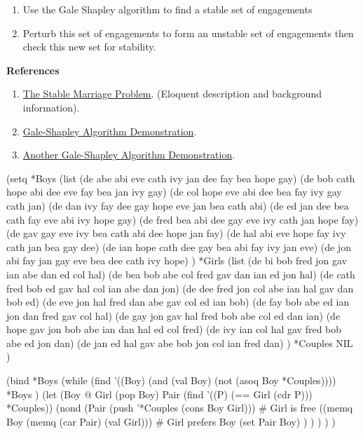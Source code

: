 \begin{itemize}
\begin{enumerate}
\item
  Use the Gale Shapley algorithm to find a stable set of engagements
\item
  Perturb this set of engagements to form an unstable set of engagements
  then check this new set for stability.
\end{enumerate}

\textbf{References}

\begin{enumerate}
\item
  \href{http://www.cs.columbia.edu/~evs/intro/stable/writeup.html}{The
  Stable Marriage Problem}. (Eloquent description and background
  information).
\item
  \href{http://sephlietz.com/gale-shapley/}{Gale-Shapley Algorithm
  Demonstration}.
\item
  \href{http://mathsite.math.berkeley.edu/smp/smp.html}{Another
  Gale-Shapley Algorithm Demonstration}.
\end{enumerate}

\begin{wideverbatim}

(setq
   *Boys (list
      (de abe  abi eve cath ivy jan dee fay bea hope gay)
      (de bob  cath hope abi dee eve fay bea jan ivy gay)
      (de col  hope eve abi dee bea fay ivy gay cath jan)
      (de dan  ivy fay dee gay hope eve jan bea cath abi)
      (de ed   jan dee bea cath fay eve abi ivy hope gay)
      (de fred bea abi dee gay eve ivy cath jan hope fay)
      (de gav  gay eve ivy bea cath abi dee hope jan fay)
      (de hal  abi eve hope fay ivy cath jan bea gay dee)
      (de ian  hope cath dee gay bea abi fay ivy jan eve)
      (de jon  abi fay jan gay eve bea dee cath ivy hope) )
   *Girls (list
      (de bi   bob fred jon gav ian abe dan ed col hal)
      (de bea  bob abe col fred gav dan ian ed jon hal)
      (de cath fred bob ed gav hal col ian abe dan jon)
      (de dee  fred jon col abe ian hal gav dan bob ed)
      (de eve  jon hal fred dan abe gav col ed ian bob)
      (de fay  bob abe ed ian jon dan fred gav col hal)
      (de gay  jon gav hal fred bob abe col ed dan ian)
      (de hope gav jon bob abe ian dan hal ed col fred)
      (de ivy  ian col hal gav fred bob abe ed jon dan)
      (de jan  ed hal gav abe bob jon col ian fred dan) )
   *Couples NIL )

(bind *Boys
   (while
      (find
         '((Boy) (and (val Boy) (not (asoq Boy *Couples))))
         *Boys )
      (let (Boy @  Girl (pop Boy)  Pair (find '((P) (== Girl (cdr P))) *Couples))
         (nond
            (Pair (push '*Couples (cons Boy Girl)))   # Girl is free
            ((memq Boy (memq (car Pair) (val Girl)))  # Girl prefers Boy
               (set Pair Boy) ) ) ) ) )


\end{wideverbatim}
\end{itemize}
